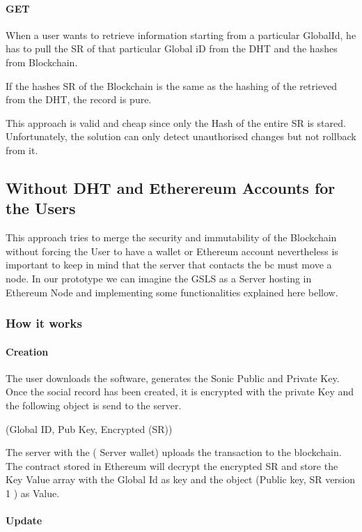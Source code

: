 \paragraph{GET}

When a user wants to retrieve information starting from a particular GlobalId, he has to pull the SR of that particular Global iD from the DHT and the hashes from Blockchain.

If the hashes SR of the Blockchain is the same as the hashing of the retrieved from the DHT, the record is pure.

This approach is valid and cheap since only the Hash of the entire SR is stared.
Unfortunately, the solution can only detect unauthorised changes but not rollback from it.

\subsection{Without DHT and Etherereum Accounts for the Users}
This approach tries to merge the security and immutability of the Blockchain without forcing the User to have a wallet or Ethereum account nevertheless is important to keep in mind that the server that contacts the bc must move a node. In our prototype we can imagine the GSLS as a Server hosting in Ethereum Node and implementing some functionalities explained here bellow.

\subsubsection{How it works}

\paragraph{Creation}

The user downloads the software, generates the Sonic Public and Private Key. Once the social record has been created, it is encrypted with the private Key and the following object is send to the server.

(Global ID, Pub Key, Encrypted (SR))

The server with the ( Server wallet) uploads the transaction to the blockchain. The contract stored in Ethereum will decrypt the encrypted SR and store the Key Value array with the Global Id as key and the object (Public key, SR version 1 ) as Value.

\paragraph{Update}

